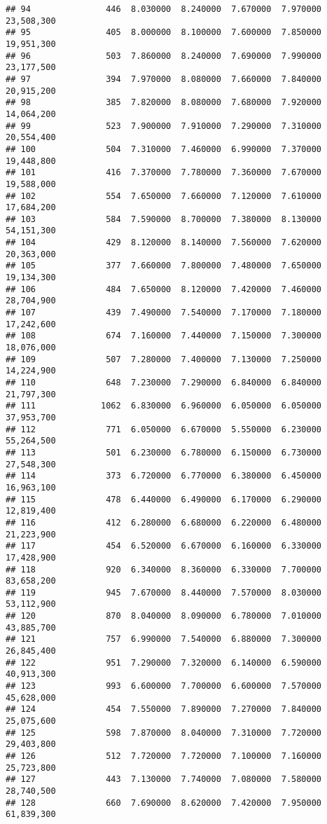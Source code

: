 \documentclass[]{article}
\begin{document}
\begin{verbatim}
## 94               446  8.030000  8.240000  7.670000  7.970000  23,508,300
## 95               405  8.000000  8.100000  7.600000  7.850000  19,951,300
## 96               503  7.860000  8.240000  7.690000  7.990000  23,177,500
## 97               394  7.970000  8.080000  7.660000  7.840000  20,915,200
## 98               385  7.820000  8.080000  7.680000  7.920000  14,064,200
## 99               523  7.900000  7.910000  7.290000  7.310000  20,554,400
## 100              504  7.310000  7.460000  6.990000  7.370000  19,448,800
## 101              416  7.370000  7.780000  7.360000  7.670000  19,588,000
## 102              554  7.650000  7.660000  7.120000  7.610000  17,684,200
## 103              584  7.590000  8.700000  7.380000  8.130000  54,151,300
## 104              429  8.120000  8.140000  7.560000  7.620000  20,363,000
## 105              377  7.660000  7.800000  7.480000  7.650000  19,134,300
## 106              484  7.650000  8.120000  7.420000  7.460000  28,704,900
## 107              439  7.490000  7.540000  7.170000  7.180000  17,242,600
## 108              674  7.160000  7.440000  7.150000  7.300000  18,076,000
## 109              507  7.280000  7.400000  7.130000  7.250000  14,224,900
## 110              648  7.230000  7.290000  6.840000  6.840000  21,797,300
## 111             1062  6.830000  6.960000  6.050000  6.050000  37,953,700
## 112              771  6.050000  6.670000  5.550000  6.230000  55,264,500
## 113              501  6.230000  6.780000  6.150000  6.730000  27,548,300
## 114              373  6.720000  6.770000  6.380000  6.450000  16,963,100
## 115              478  6.440000  6.490000  6.170000  6.290000  12,819,400
## 116              412  6.280000  6.680000  6.220000  6.480000  21,223,900
## 117              454  6.520000  6.670000  6.160000  6.330000  17,428,900
## 118              920  6.340000  8.360000  6.330000  7.700000  83,658,200
## 119              945  7.670000  8.440000  7.570000  8.030000  53,112,900
## 120              870  8.040000  8.090000  6.780000  7.010000  43,885,700
## 121              757  6.990000  7.540000  6.880000  7.300000  26,845,400
## 122              951  7.290000  7.320000  6.140000  6.590000  40,913,300
## 123              993  6.600000  7.700000  6.600000  7.570000  45,628,000
## 124              454  7.550000  7.890000  7.270000  7.840000  25,075,600
## 125              598  7.870000  8.040000  7.310000  7.720000  29,403,800
## 126              512  7.720000  7.720000  7.100000  7.160000  25,723,800
## 127              443  7.130000  7.740000  7.080000  7.580000  28,740,500
## 128              660  7.690000  8.620000  7.420000  7.950000  61,839,300

\end{verbatim}
\end{document}
